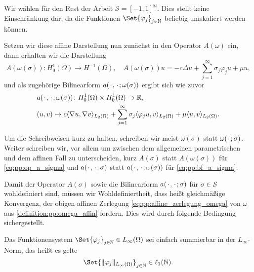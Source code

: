 \begin{Bemerkung}
    Wir wählen für den Rest der Arbeit $\mathcal S = [-1, 1]^{\mathbb{N}}$.
    Dies stellt keine Einschränkung dar, da die Funktionen $\Set{ \varphi_{j} }_{j \in \mathbb{N}}$ beliebig umskaliert werden können.
\end{Bemerkung}

Setzen wir diese affine Darstellung nun zunächst in den Operator $A(\omega)$ ein, dann erhalten wir die Darstellung
\begin{equation}
\label{eq:pp:op_a_sigma}
    A(\omega(\sigma)) \colon H^{1}_{0}(\Omega) \to H^{-1}(\Omega), \quad A(\omega(\sigma)) u = -c \Delta u + \sum_{j = 1}^{\infty} \sigma_{j} \varphi_{j} u + \mu u,
\end{equation}
und als zugehörige Bilinearform $a({\mkern2mu\cdot\mkern2mu}, {\mkern2mu\cdot\mkern2mu}; \omega(\sigma))$ ergibt sich wie zuvor
\begin{equation}
\label{eq:pp:bf_a_sigma}
    \begin{aligned}
    &a({\mkern2mu\cdot\mkern2mu}, {\mkern2mu\cdot\mkern2mu}; \omega(\sigma)) \colon H^{1}_{0}(\Omega) \times H^{1}_{0}(\Omega) \to \mathbb{R}, \\
    &(u, v) \mapsto c\langle\nabla u,\nabla v\rangle_{L_{2}(\Omega)} + \sum_{j = 1}^{\infty} \sigma_{j} \langle\varphi_{j} u,v\rangle_{L_{2}(\Omega)} + \mu \langle u,v\rangle_{L_{2}(\Omega)}.
    \end{aligned}
\end{equation}

\begin{Bemerkung}
    Um die Schreibweisen kurz zu halten, schreiben wir meist $\omega(\sigma)$ statt $\omega({\mkern2mu\cdot\mkern2mu}; \sigma)$.
    Weiter schreiben wir, vor allem um zwischen dem allgemeinen parametrischen und dem affinen Fall zu unterscheiden, kurz $A(\sigma)$ statt $A(\omega(\sigma))$ für \cref{eq:pp:op_a_sigma} und $a({\mkern2mu\cdot\mkern2mu}, {\mkern2mu\cdot\mkern2mu}; \sigma)$ statt $a({\mkern2mu\cdot\mkern2mu}, {\mkern2mu\cdot\mkern2mu}; \omega(\sigma))$ für \cref{eq:pp:bf_a_sigma}.
\end{Bemerkung}

Damit der Operator $A(\sigma)$ sowie die Bilinearform $a({\mkern2mu\cdot\mkern2mu}, {\mkern2mu\cdot\mkern2mu}; \sigma)$ für $\sigma \in \mathcal S$ wohldefiniert sind, müssen wir Wohldefiniertheit, dass heißt gleichmäßige Konvergenz, der obigen affinen Zerlegung \cref{eq:pp:affine_zerlegung_omega} von $\omega$ aus \cref{definition:pp:omega_affin} fordern.
Dies wird durch folgende Bedingung sichergestellt.
\begin{Annahme}
    Das Funktionensystem $\Set{ \varphi_{j} }_{j \in \mathbb{N}} \in L_{\infty}(\Omega)$ sei einfach summierbar in der $L_{\infty}$-Norm, das heißt es gelte
    \begin{equation}
        \Set{ \norm{\varphi_{j}}_{L_{\infty}(\Omega) } }_{j \in \mathbb{N}} \in \ell_{1}(\mathbb{N}).
    \end{equation}
\end{Annahme}

